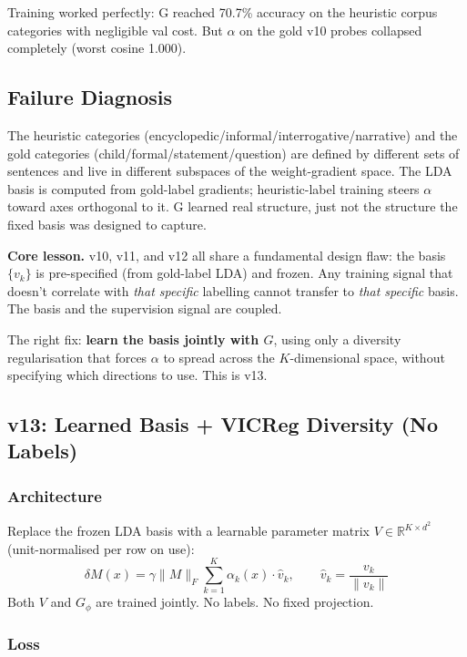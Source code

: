 \documentclass[11pt, a4paper]{article}
\theoremstyle{plain}
\theoremstyle{definition}
\theoremstyle{remark}
\begin{document}
Training worked perfectly: G reached 70.7\% accuracy on the heuristic corpus
categories with negligible val cost.
But $\alpha$ on the gold v10 probes collapsed completely (worst cosine 1.000).

\subsection{Failure Diagnosis}

The heuristic categories (encyclopedic/informal/interrogative/narrative) and the
gold categories (child/formal/statement/question) are defined by different sets of
sentences and live in different subspaces of the weight-gradient space.
The LDA basis is computed from gold-label gradients; heuristic-label training
steers $\alpha$ toward axes orthogonal to it.
G learned real structure, just not the structure the fixed basis was designed to
capture.

\textbf{Core lesson.}
v10, v11, and v12 all share a fundamental design flaw: the basis $\{v_k\}$ is
pre-specified (from gold-label LDA) and frozen.
Any training signal that doesn't correlate with \emph{that specific} labelling
cannot transfer to \emph{that specific} basis.
The basis and the supervision signal are coupled.

The right fix: \textbf{learn the basis jointly with $G$}, using only a diversity
regularisation that forces $\alpha$ to spread across the $K$-dimensional space,
without specifying which directions to use.
This is v13.

\subsection{v13: Learned Basis + VICReg Diversity (No Labels)}
\label{sec:v13-design}

\subsubsection{Architecture}

Replace the frozen LDA basis with a learnable parameter matrix
$V \in \mathbb{R}^{K \times d^2}$ (unit-normalised per row on use):
\begin{equation}
\delta M(x) = \gamma \|M\|_F \sum_{k=1}^K \alpha_k(x) \cdot \hat{v}_k, \qquad
\hat{v}_k = \frac{v_k}{\|v_k\|}
\end{equation}
Both $V$ and $G_\phi$ are trained jointly.
No labels. No fixed projection.

\subsubsection{Loss}
\end{document}
